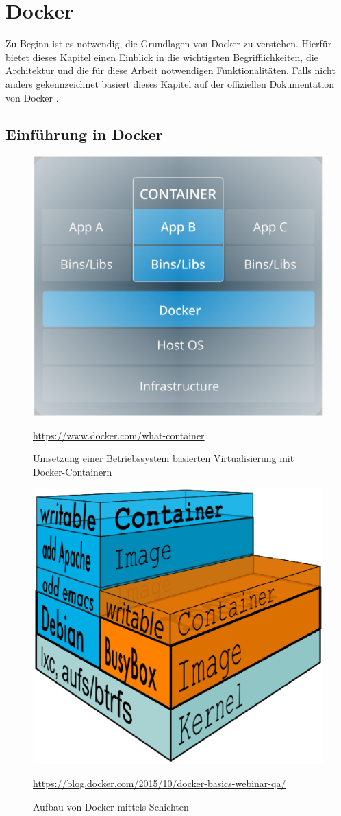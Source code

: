 \chapter{Docker}
\label{c:docker}

Zu Beginn ist es notwendig, die Grundlagen von Docker zu verstehen.
Hierfür bietet dieses Kapitel einen Einblick in die wichtigsten Begrifflichkeiten, die Architektur und die für diese Arbeit notwendigen Funktionalitäten.
Falls nicht anders gekennzeichnet basiert dieses Kapitel auf der offiziellen Dokumentation von Docker \cite{Docker:online1}.

\section{Einführung in Docker}
\label{c:einführung}

\begin{figure}
	\centering
	\includegraphics[width=0.7\linewidth]{figures/Docker}
	\caption[Betriebssystem basierte Virtualisierung mit Docker-Containern]{Umsetzung einer Betriebssystem basierten Virtualisierung mit Docker-Containern}
	\label{fig:docker}
	\tiny{\quelle\url{https://www.docker.com/what-container}}
\end{figure}

\begin{figure}
	\centering
	\includegraphics[width=0.7\linewidth]{figures/DockerLayer}
	\caption[Aufbau von Docker mittels Schichten]{Aufbau von Docker mittels Schichten}
	\label{fig:dockerlayer}
	\tiny{\quelle\url{https://blog.docker.com/2015/10/docker-basics-webinar-qa/}}
\end{figure}

